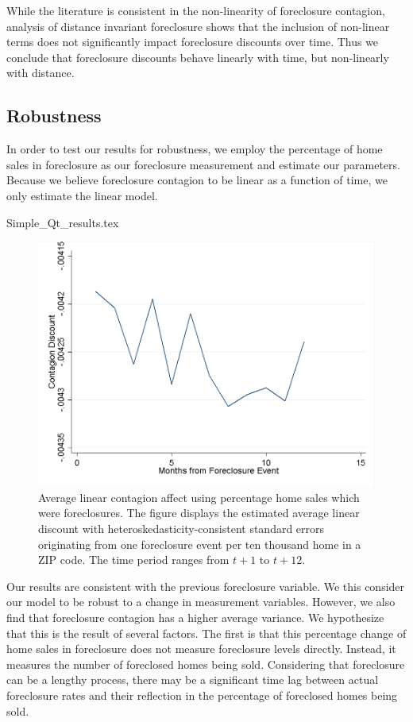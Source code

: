 \documentclass[12pt,oneside]{amsbook}
\begin{document}
While the literature is consistent in the non-linearity of foreclosure contagion, analysis of distance invariant foreclosure shows that the inclusion of non-linear terms does not significantly impact foreclosure discounts over time. Thus we conclude that foreclosure discounts behave linearly with time, but non-linearly with distance.

\subsection{Robustness}
In order to test our results for robustness, we employ the percentage of home sales in foreclosure as our foreclosure measurement and estimate our parameters. Because we believe foreclosure contagion to be linear as a function of time, we only estimate the linear model.

{Simple_Qt_results.tex}

\begin{figure}\label{fig:robust_lin} 
\centering
\includegraphics[width=\textwidth]{robust_20MSA_solo.png}
\caption{\tiny Average linear contagion affect using percentage home sales which were foreclosures. The figure displays the estimated average linear discount with heteroskedasticity-consistent standard errors originating from one foreclosure event per ten thousand home in a ZIP code. The time period ranges from $t+1$ to $t+12$. }
\end{figure}

Our results are consistent with the previous foreclosure variable. We this consider our model to be robust to a change in measurement variables. However, we also find that foreclosure contagion has a higher average variance. We hypothesize that this is the result of several factors. The first is that this percentage change of home sales in foreclosure does not measure foreclosure levels directly. Instead, it measures the number of foreclosed homes being sold. Considering that foreclosure can be a lengthy process, there may be a significant time lag between actual foreclosure rates and their reflection in the percentage of foreclosed homes being sold.
\end{document}
